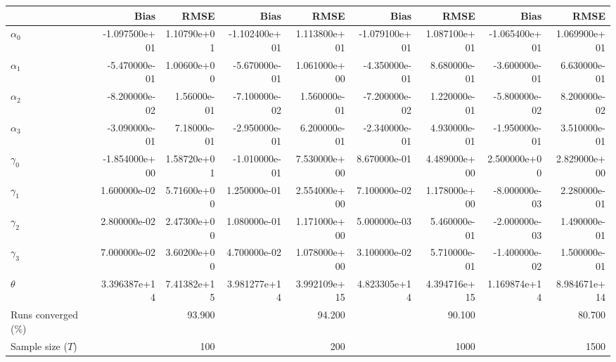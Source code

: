 
\begin{tabular}[t]{lrrrrrrrr}
\toprule
  & Bias & RMSE & Bias & RMSE & Bias & RMSE & Bias & RMSE\\
\midrule
$\alpha_{0}$ & -1.097500e+01 & 1.10790e+01 & -1.102400e+01 & 1.113800e+01 & -1.079100e+01 & 1.087100e+01 & -1.065400e+01 & 1.069900e+01\\
$\alpha_{1}$ & -5.470000e-01 & 1.00600e+00 & -5.670000e-01 & 1.061000e+00 & -4.350000e-01 & 8.680000e-01 & -3.600000e-01 & 6.630000e-01\\
$\alpha_{2}$ & -8.200000e-02 & 1.56000e-01 & -7.100000e-02 & 1.560000e-01 & -7.200000e-02 & 1.220000e-01 & -5.800000e-02 & 8.200000e-02\\
$\alpha_{3}$ & -3.090000e-01 & 7.18000e-01 & -2.950000e-01 & 6.200000e-01 & -2.340000e-01 & 4.930000e-01 & -1.950000e-01 & 3.510000e-01\\
$\gamma_{0}$ & -1.854000e+00 & 1.58720e+01 & -1.010000e-01 & 7.530000e+00 & 8.670000e-01 & 4.489000e+00 & 2.500000e+00 & 2.829000e+00\\
$\gamma_{1}$ & 1.600000e-02 & 5.71600e+00 & 1.250000e-01 & 2.554000e+00 & 7.100000e-02 & 1.178000e+00 & -8.000000e-03 & 2.280000e-01\\
$\gamma_{2}$ & 2.800000e-02 & 2.47300e+00 & 1.080000e-01 & 1.171000e+00 & 5.000000e-03 & 5.460000e-01 & -2.000000e-03 & 1.490000e-01\\
$\gamma_{3}$ & 7.000000e-02 & 3.60200e+00 & 4.700000e-02 & 1.078000e+00 & 3.100000e-02 & 5.710000e-01 & -1.400000e-02 & 1.500000e-01\\
$\theta$ & 3.396387e+14 & 7.41382e+15 & 3.981277e+14 & 3.992109e+15 & 4.823305e+14 & 4.394716e+15 & 1.169874e+14 & 8.984671e+14\\
Runs converged (\%) &  & 93.900 &  & 94.200 &  & 90.100 &  & 80.700\\
Sample size ($T$) &  & 100 &  & 200 &  & 1000 &  & 1500\\
\bottomrule
\end{tabular}
